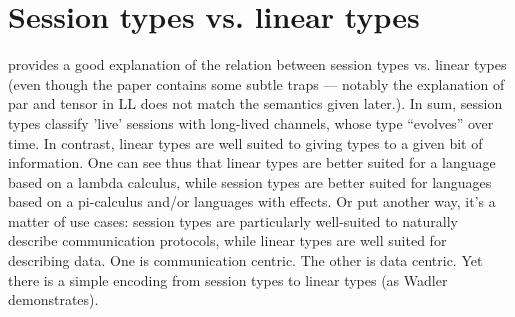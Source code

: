 \documentclass[11pt]{article}
\begin{document}
\section{Session types vs. linear types}

\Textcite{wadler_propositions_2012} provides a good explanation of
the relation between session types vs. linear types (even though the
paper contains some subtle traps --- notably the explanation of par
and tensor in LL does not match the semantics given later.). In sum,
session types classify 'live' sessions with long-lived channels, whose
type ``evolves'' over time. In contrast, linear types are well suited
to giving types to a given bit of information. One can see thus that
linear types are better suited for a language based on a lambda
calculus, while session types are better suited for languages based on
a pi-calculus and/or languages with effects. Or put another way,
it's a matter of use cases: session types are particularly well-suited
to naturally describe communication protocols, while linear types are
well suited for describing data. One is communication centric. The
other is data centric. Yet there is a simple
encoding from session types to linear types (as Wadler demonstrates).

\printbibliography
\end{document}

